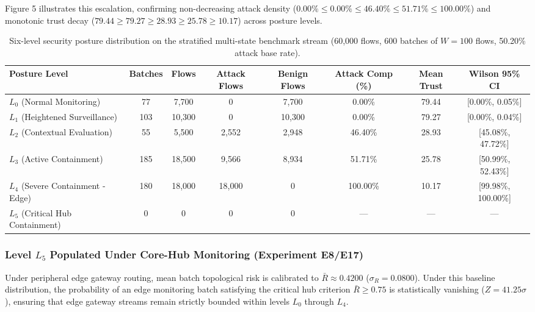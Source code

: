 \documentclass[journal,10pt,onecolumn]{IEEEtran}
\begin{document}
Figure 5 illustrates this escalation, confirming non-decreasing attack density ($0.00\% \le 0.00\% \le 46.40\% \le 51.71\% \le 100.00\%$) and monotonic trust decay ($79.44 \ge 79.27 \ge 28.93 \ge 25.78 \ge 10.17$) across posture levels.

\begin{table}[t]
\caption{Six-level security posture distribution on the stratified multi-state benchmark stream (60,000 flows, 600 batches of $W=100$ flows, 50.20\% attack base rate).}
\label{tab:posture_balanced}
\centering
\small
\begin{tabular}{lccccccc}
\toprule
\textbf{Posture Level} & \textbf{Batches} & \textbf{Flows} & \textbf{Attack Flows} & \textbf{Benign Flows} & \textbf{Attack Comp (\%)} & \textbf{Mean Trust} & \textbf{Wilson 95\% CI} \\
\midrule
$L_0$ (Normal Monitoring) & 77 & 7,700 & 0 & 7,700 & 0.00\% & 79.44 & [0.00\%, 0.05\%] \\
$L_1$ (Heightened Surveillance) & 103 & 10,300 & 0 & 10,300 & 0.00\% & 79.27 & [0.00\%, 0.04\%] \\
$L_2$ (Contextual Evaluation) & 55 & 5,500 & 2,552 & 2,948 & 46.40\% & 28.93 & [45.08\%, 47.72\%] \\
$L_3$ (Active Containment) & 185 & 18,500 & 9,566 & 8,934 & 51.71\% & 25.78 & [50.99\%, 52.43\%] \\
$L_4$ (Severe Containment - Edge) & 180 & 18,000 & 18,000 & 0 & 100.00\% & 10.17 & [99.98\%, 100.00\%] \\
$L_5$ (Critical Hub Containment) & 0 & 0 & 0 & 0 & --- & --- & --- \\
\bottomrule
\end{tabular}
\end{table}

\subsubsection{Level $L_5$ Populated Under Core-Hub Monitoring (Experiment E8/E17)}
Under peripheral edge gateway routing, mean batch topological risk is calibrated to $\bar{R} \approx 0.4200$ ($\sigma_R = 0.0800$). Under this baseline distribution, the probability of an edge monitoring batch satisfying the critical hub criterion $\bar{R} \ge 0.75$ is statistically vanishing ($Z = 41.25\sigma$), ensuring that edge gateway streams remain strictly bounded within levels $L_0$ through $L_4$.
\end{document}

